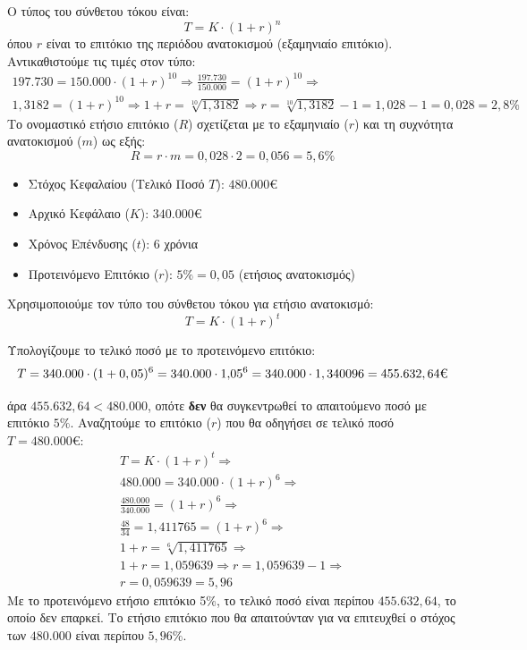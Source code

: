 \documentclass[11pt,a4paper]{article}
\begin{document}
\begin{Alist}
Ο τύπος του σύνθετου τόκου είναι:
$$T = K \cdot (1 + r)^n$$
όπου $r$ είναι το επιτόκιο της περιόδου ανατοκισμού (εξαμηνιαίο επιτόκιο). Αντικαθιστούμε τις τιμές στον τύπο:
\begin{gather*}
197.730 = 150.000 \cdot (1 + r)^{10}
\Rightarrow\frac{197.730}{150.000} = (1 + r)^{10}\Rightarrow\\
1,3182 = (1 + r)^{10}\Rightarrow 1+r=\sqrt[10]{1{,}3182}\Rightarrow r=\sqrt[10]{1{,}3182}-1=1{,}028-1=0{,}028=2{,}8\%
\end{gather*}
Το ονομαστικό ετήσιο επιτόκιο ($R$) σχετίζεται με το εξαμηνιαίο ($r$) και τη συχνότητα ανατοκισμού ($m$) ως εξής:
$$R = r \cdot m = 0,028 \cdot 2 = 0,056 = 5,6\%$$

\item 
\begin{itemize}
    \item Στόχος Κεφαλαίου (Τελικό Ποσό $T$): $480.000€$
    \item Αρχικό Κεφάλαιο ($K$): $340.000€$
    \item Χρόνος Επένδυσης ($t$): $6$ χρόνια
    \item Προτεινόμενο Επιτόκιο ($r$): $5\% = 0,05$ (ετήσιος ανατοκισμός)
\end{itemize}

Χρησιμοποιούμε τον τύπο του σύνθετου τόκου για ετήσιο ανατοκισμό:
$$T = K \cdot (1 + r)^t$$

Υπολογίζουμε το τελικό ποσό με το προτεινόμενο επιτόκιο:
$$T= 340.000 \cdot (1 + 0,05)^6= 340.000 \cdot 1{,}05^6 = 340.000 \cdot 1,340096 = 455.632,64\text{\texteuro}$$

άρα $455.632,64$\texteuro  $< 480.000$\texteuro, οπότε \textbf{δεν} θα συγκεντρωθεί το απαιτούμενο ποσό με επιτόκιο $5\%$. Αναζητούμε το επιτόκιο ($r$) που θα οδηγήσει σε τελικό ποσό $T = 480.000€$:
\begin{gather*}
T = K \cdot (1 + r)^t\Rightarrow\\
480.000 = 340.000 \cdot (1 + r)^6\Rightarrow\\
\frac{480.000}{340.000} = (1 + r)^6\Rightarrow\\
\frac{48}{34} = 1,411765 = (1 + r)^6\Rightarrow\\
1 + r = \sqrt[6]{1,411765}\Rightarrow\\
1 + r = 1,059639\Rightarrow r = 1,059639 - 1\Rightarrow\\
r = 0,059639= 5,96
\end{gather*}
Με το προτεινόμενο ετήσιο επιτόκιο 5\%, το τελικό ποσό είναι περίπου ${455.632,64}$, το οποίο δεν επαρκεί. Το ετήσιο επιτόκιο που θα απαιτούνταν για να επιτευχθεί ο στόχος των $480.000$ είναι περίπου ${5,96\%}$.
\end{Alist}
\end{document}
